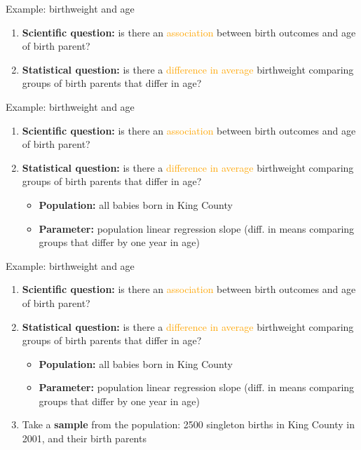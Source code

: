 \documentclass[10pt,t]{beamer}
\begin{document}
\begin{frame}{Example: birthweight and age}
\begin{enumerate}
	\item \textbf{Scientific question:} is there an \textcolor{orange}{association} between birth outcomes and age of birth parent?
	\item \textbf{Statistical question:} is there a \textcolor{orange}{difference in average} birthweight comparing groups of birth parents that differ in age?
\end{enumerate}
\end{frame}

\begin{frame}{Example: birthweight and age}
\begin{enumerate}
	\item \textbf{Scientific question:} is there an \textcolor{orange}{association} between birth outcomes and age of birth parent?
	\item \textbf{Statistical question:} is there a \textcolor{orange}{difference in average} birthweight comparing groups of birth parents that differ in age?
	\begin{itemize}
		\item \textbf{Population:} all babies born in King County
		\item \textbf{Parameter:} population linear regression slope (diff. in means comparing groups that differ by one year in age)
	\end{itemize}
\end{enumerate}
\end{frame}

\begin{frame}{Example: birthweight and age}
\begin{enumerate}
	\item \textbf{Scientific question:} is there an \textcolor{orange}{association} between birth outcomes and age of birth parent?
	\item \textbf{Statistical question:} is there a \textcolor{orange}{difference in average} birthweight comparing groups of birth parents that differ in age?
	\begin{itemize}
		\item \textbf{Population:} all babies born in King County
		\item \textbf{Parameter:} population linear regression slope (diff. in means comparing groups that differ by one year in age)
	\end{itemize}
	\item Take a \textbf{sample} from the population: 2500 singleton births in King County in 2001, and their birth parents
\end{enumerate}
\end{frame}
\end{document}
